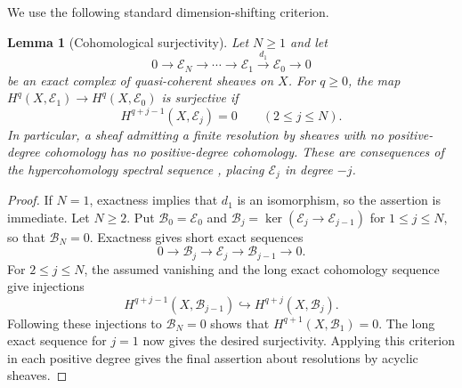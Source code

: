 \documentclass[11pt,letterpaper]{article}
\renewcommand{\le}{\leqslant}
\renewcommand{\ge}{\geqslant}
\newtheorem{lemma}[theorem]{Lemma}
\theoremstyle{definition}
\theoremstyle{remark}
\begin{document}
We use the following standard dimension-shifting criterion.

\begin{lemma}[Cohomological surjectivity]
\label{lem:cyl-exact-complex}\label{lem:cohomological-surjectivity}
Let $N\ge1$ and let
\[
 0\longrightarrow\mathcal E_N\longrightarrow\cdots
 \longrightarrow\mathcal E_1\xrightarrow{\ d_1\ }\mathcal E_0
 \longrightarrow0
\]
be an exact complex of quasi-coherent sheaves on $X$.
For $q\ge0$, the map
$H^q(X,\mathcal E_1)\to H^q(X,\mathcal E_0)$ is surjective if
\[
 H^{q+j-1}(X,\mathcal E_j)=0\qquad(2\le j\le N).
\]
In particular, a sheaf admitting a finite resolution by sheaves
with no positive-degree cohomology has no positive-degree cohomology.
These are consequences of the hypercohomology spectral sequence
\cite[Lemma~13.21.3, Tag~015J]{Stacks}, placing
$\mathcal E_j$ in degree $-j$.
\end{lemma}

\begin{proof}
If $N=1$, exactness implies that $d_1$ is an isomorphism, so the
assertion is immediate. Let $N\ge2$.
Put $\mathcal B_0=\mathcal E_0$ and
$\mathcal B_j=\ker(\mathcal E_j\to\mathcal E_{j-1})$
for $1\le j\le N$, so that $\mathcal B_N=0$.
Exactness gives short exact sequences
\[
0\longrightarrow \mathcal B_j
 \longrightarrow \mathcal E_j
 \longrightarrow \mathcal B_{j-1}
 \longrightarrow 0.
\]
For $2\le j\le N$, the assumed vanishing and the long exact
cohomology sequence give injections
\[
H^{q+j-1}(X,\mathcal B_{j-1})
\hookrightarrow H^{q+j}(X,\mathcal B_j).
\]
Following these injections to $\mathcal B_N=0$ shows that
$H^{q+1}(X,\mathcal B_1)=0$.
The long exact sequence for $j=1$ now gives the desired
surjectivity. Applying this criterion in each positive degree
gives the final assertion about resolutions by acyclic sheaves.
\end{proof}


{}
{}


\end{document}
